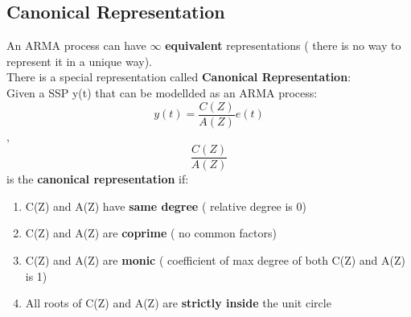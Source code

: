 \subsection{Canonical Representation}
An ARMA process can have $\infty$ \textbf{equivalent} representations ( there is no way to represent it in a unique way).\\
There is a special representation called \textbf{Canonical Representation}: \\
Given a SSP y(t) that can be modellded as an ARMA process: $$ y(t) = \frac{C(Z)}{A(Z)}e(t)$$ , $$ \frac{C(Z)}{A(Z)}$$ is the \textbf{canonical representation} if:
\begin{enumerate}
\item C(Z) and A(Z) have \textbf{same degree} ( relative degree is 0)
\item C(Z) and A(Z) are \textbf{coprime} ( no common factors)
\item C(Z) and A(Z) are  \textbf{monic} ( coefficient of max degree of both C(Z) and A(Z) is 1)
\item All roots of C(Z) and A(Z) are \textbf{strictly inside} the unit circle
\end{enumerate}
